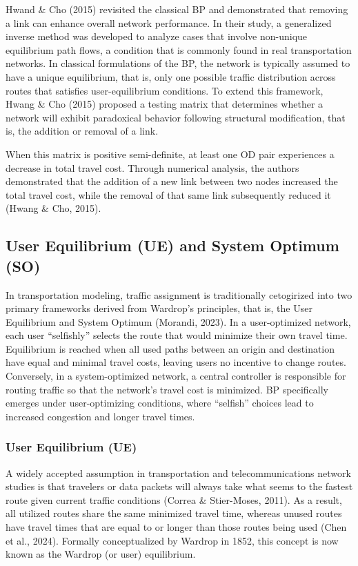 Hwand \& Cho (2015) revisited the classical BP and demonstrated that removing a link can enhance overall network performance. In their study, a generalized inverse method was developed to analyze cases that involve non-unique equilibrium path flows,  a condition that is commonly found in real transportation networks. In classical formulations of the BP, the network is typically assumed to have a unique equilibrium, that is, only one possible traffic distribution across routes that satisfies user-equilibrium conditions. To extend this framework, Hwang \& Cho (2015) proposed a testing matrix that determines whether a network will exhibit paradoxical behavior following structural modification, that is, the addition or removal of a link. 

When this matrix is positive semi-definite, at least one OD pair experiences a decrease in total travel cost. Through numerical analysis, the authors demonstrated that the addition of a new link between two nodes increased the total travel cost, while the removal of that same link subsequently reduced it (Hwang \& Cho, 2015). 

\subsection{User Equilibrium (UE) and System Optimum (SO)}
\label{chap:UE_and_SO}

In transportation modeling, traffic assignment is traditionally cetogirized into two primary frameworks derived from Wardrop's principles, that is, the User Equilibrium and System Optimum (Morandi, 2023). In a user-optimized network, each user “selfishly” selects the route that would minimize their own travel time. Equilibrium is reached when all used paths between an origin and destination have equal and minimal travel costs, leaving users no incentive to change routes. Conversely, in a system-optimized network, a central controller is responsible for routing traffic so that the network's travel cost is minimized. BP specifically emerges under user-optimizing conditions, where “selfish” choices lead to increased congestion and longer travel times.

\subsubsection{User Equilibrium (UE)}
\label{chap:UE}

A widely accepted assumption in transportation and telecommunications network studies is that travelers or data packets will always take what seems to the fastest route given current traffic conditions (Correa \& Stier-Moses, 2011). As a result, all utilized routes share the same minimized travel time, whereas unused routes have travel times that are equal to or longer than those routes being used (Chen et al., 2024). Formally conceptualized by Wardrop in 1852, this concept is now known as the Wardrop (or user) equilibrium.

